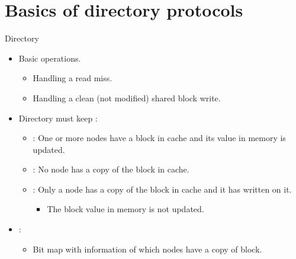 \section{Basics of directory protocols}

\begin{frame}[t]{Directory}
\begin{itemize}
  \item Basic operations.
    \begin{itemize}
      \item Handling a read miss.
      \item Handling a clean (not modified) shared block write.
    \end{itemize}

  \item Directory must keep :
    \begin{itemize}
      \item {}: 
            One or more nodes have a block in cache and its value in memory is updated.
      \item {}: 
            No node has a copy of the block in cache. 
      \item {}: 
            Only a node has a copy of the block in cache and it has written on it.
        \begin{itemize}
          \item The block value in memory is not updated.
        \end{itemize}
    \end{itemize}

  \item {}:
    \begin{itemize}
      \item Bit map with information of which nodes have a copy of block.
    \end{itemize}
\end{itemize}
\end{frame}

